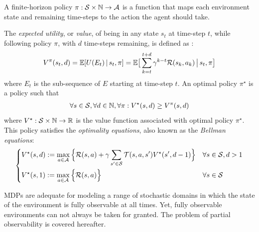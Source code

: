\begin{definition}
\label{def:policymdp}
A finite-horizon policy $\pi : \mathcal{S} \times \mathbb{N} \rightarrow \mathcal{A}$ is a function that maps each environment state and remaining time-steps to the action the agent should take.
\end{definition}
The \textit{expected utility}, or \textit{value}, of being in any state $s_t$ at time-step $t$, while following policy $\pi$, with $d$ time-steps remaining, is defined as \cite{Nitti2017}:
\begin{align}
    V^{\pi}(s_t, d) = \mathbb{E}[U(E_t) \, | \, s_t, \pi] = \mathbb{E} \big[ \sum_{k = t }^{t+d} \gamma^{k-t} \mathcal{R}(s_k, a_k) \, \big| \, s_t, \pi \big ]
\end{align}
where $E_t$ is the sub-sequence of $E$ starting at time-step $t$. An optimal policy $\pi^\star$ is a policy such that
\begin{align}
    \forall s \in \mathcal{S}, \forall d \in \mathbb{N}, \forall \pi : V^{\star}(s,d) \geq V^{\pi}(s,d) 
\end{align}
where $V^{\star} : \mathcal{S} \times \mathbb{N} \rightarrow \mathbb{R}$ is the value function associated with optimal policy $\pi^{\star}$.
This policy satisfies the \textit{optimality equations}, also known as the \textit{Bellman equations}:
\begin{align}
\label{eq:bellman}
        \begin{dcases}
            V^{\star}(s, d) := \max_{a \in \mathcal{A}} \Big\{ \mathcal{R}(s,a) + \gamma \sum_{s' \in \mathcal{S}} \mathcal{T}(s,a,s') V^{\star}(s', d-1) \Big\}  &\forall s \in \mathcal{S}, d > 1
            \\
            V^{\star}(s, 1) := \max_{a \in \mathcal{A}} \Big\{ \mathcal{R}(s,a) \Big\} &\forall s \in \mathcal{S}
        \end{dcases}
    \end{align}
    
MDPs are adequate for modeling a range of stochastic domains in which the state of the environment is fully observable at all times. Yet, fully observable environments can not always be taken for granted. The problem of partial observability is covered hereafter.

